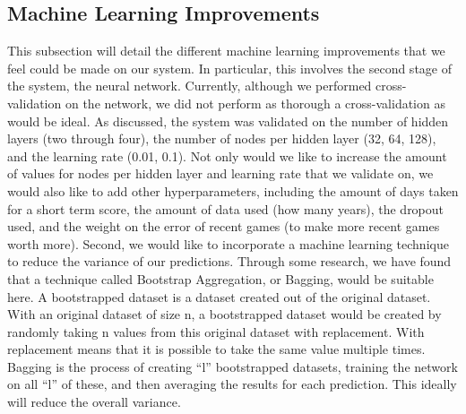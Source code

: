 \subsection{Machine Learning Improvements}
This subsection will detail the different machine learning improvements that we feel could be made on our system. In particular, this involves the second stage of the system, the neural network. Currently, although we performed cross-validation on the network, we did not perform as thorough a cross-validation as would be ideal. As discussed, the system was validated on the number of hidden layers (two through four), the number of nodes per hidden layer (32, 64, 128), and the learning rate (0.01, 0.1). Not only would we like to increase the amount of values for nodes per hidden layer and learning rate that we validate on, we would also like to add other hyperparameters, including the amount of days taken for a short term score, the amount of data used (how many years), the dropout used, and the weight on the error of recent games (to make more recent games worth more).
Second, we would like to incorporate a machine learning technique to reduce the variance of our predictions. Through some research, we have found that a technique called Bootstrap Aggregation, or Bagging, would be suitable here. A bootstrapped dataset is a dataset created out of the original dataset. With an original dataset of size n, a bootstrapped dataset would be created by randomly taking n values from this original dataset with replacement. With replacement means that it is possible to take the same value multiple times. Bagging is the process of creating ``l'' bootstrapped datasets, training the network on all ``l'' of these, and then averaging the results for each prediction. This ideally will reduce the overall variance. 
